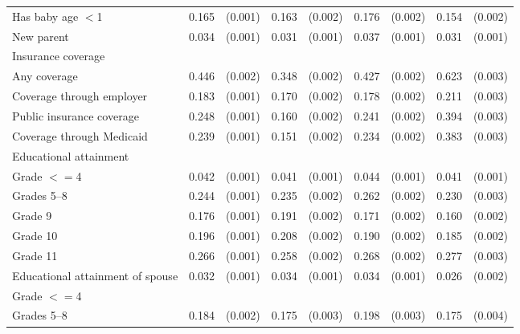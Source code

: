 \begin{tabular}{lcccccccc}
 Has baby age $<$1   & 0.165 & (0.001)  & 0.163 & (0.002)  & 0.176 & (0.002)  & 0.154 & (0.002)  \\
 New parent   & 0.034 & (0.001)  & 0.031 & (0.001)  & 0.037 & (0.001)  & 0.031 & (0.001)  \\
 Insurance coverage   & & & & & \\
 \hspace{0.3cm}  Any coverage   & 0.446 & (0.002)  & 0.348 & (0.002)  & 0.427 & (0.002)  & 0.623 & (0.003)  \\
 \hspace{0.3cm}  Coverage through employer   & 0.183 & (0.001)  & 0.170 & (0.002)  & 0.178 & (0.002)  & 0.211 & (0.003)  \\
 \hspace{0.3cm}  Public insurance coverage   & 0.248 & (0.001)  & 0.160 & (0.002)  & 0.241 & (0.002)  & 0.394 & (0.003)  \\
 \hspace{0.3cm}  Coverage through Medicaid   & 0.239 & (0.001)  & 0.151 & (0.002)  & 0.234 & (0.002)  & 0.383 & (0.003)  \\
 Educational attainment   & & & & & \\
 \hspace{0.3cm} Grade $<=$4   & 0.042 & (0.001)  & 0.041 & (0.001)  & 0.044 & (0.001)  & 0.041 & (0.001)  \\
 \hspace{0.3cm}  Grades 5--8   & 0.244 & (0.001)  & 0.235 & (0.002)  & 0.262 & (0.002)  & 0.230 & (0.003)  \\
 \hspace{0.3cm} Grade 9   & 0.176 & (0.001)  & 0.191 & (0.002)  & 0.171 & (0.002)  & 0.160 & (0.002)  \\
 \hspace{0.3cm} Grade 10   & 0.196 & (0.001)  & 0.208 & (0.002)  & 0.190 & (0.002)  & 0.185 & (0.002)  \\
 \hspace{0.3cm} Grade 11   & 0.266 & (0.001)  & 0.258 & (0.002)  & 0.268 & (0.002)  & 0.277 & (0.003)  \\
 Educational attainment of spouse   & 0.032 & (0.001)  & 0.034 & (0.001)  & 0.034 & (0.001)  & 0.026 & (0.002)  \\
 \hspace{0.3cm} Grade $<=$4   & & & & & \\
 \hspace{0.3cm}  Grades 5--8   & 0.184 & (0.002)  & 0.175 & (0.003)  & 0.198 & (0.003)  & 0.175 & (0.004)  \\

\end{tabular}
